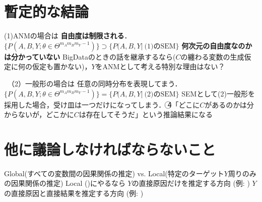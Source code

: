 \documentclass[dvipdfmx]{jsarticle}
\newcommand{\red}[1]{\textcolor{red}{#1}}
\begin{document}
\newpage
\section{暫定的な結論}
\begin{outline}
\1 (1)ANMの場合は
    \2 \textbf{自由度は制限される}．
        \3 $\{P(A, B, Y; \theta \in \Theta^{m_A  m_B  m_Y - 1})\} \supset \{P(A, B, Y | \ \text{(1)のSEM}\}$
    \2 \textbf{何次元の自由度なのかは分かっていない}
        \3 BigDataのときの話を継承するなら($C$の纏わる変数の生成仮定に何の仮定も置かない)，$Y$をANMとして考える特別な理由はない？

\1　（2）一般形の場合は
    \2 任意の同時分布を表現してまう．
        \3 $\{P(A, B, Y; \theta \in \Theta^{m_A  m_B  m_Y - 1})\} = \{P(A, B, Y | \ \text{(2)のSEM}\}$
    \2 SEMとして(2)一般形を採用した場合，受け皿は一つだけになってしまう．
        \3 \textcircled{4}「どこに$C$があるのかは分からないが，どこかに$C$は存在してそうだ」という推論結果になる
\end{outline}

\section{他に議論しなければならないこと}
\begin{outline}
\1 Global(すべての変数間の因果関係の推定) vs. Local(特定のターゲット$Y$周りのみの因果関係の推定)
\1 Local (\cite{yu2020causality})にやるなら
    \2 $Y$の直接原因だけを推定する方向 (例: \cite{zhang2021combined})
    \2 $Y$の直接原因と直接結果を推定する方向 (例: \cite{gao2015local})

\end{outline}





\end{document}
